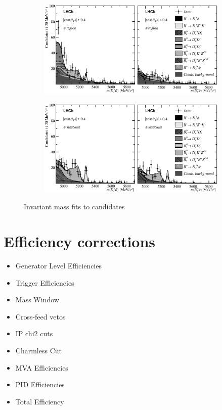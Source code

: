 \begin{figure}[!h]
    \centering
    \begin{subfigure}[t]{1.0\textwidth}
        \includegraphics[width=1.0\textwidth]{figs/B2DsPhi/Fig4a.eps}
    \end{subfigure}
    \begin{subfigure}[t]{1.0\textwidth}
        \includegraphics[width=1.0\textwidth]{figs/B2DsPhi/Fig4b.eps}
    \end{subfigure}
    \caption{Invariant mass fits to \decay{\Bp}{\Dsp\phiz} candidates}
\end{figure}



\section{Efficiency corrections}
\label{sec:B2DsPhi_effcorrections}


\begin{itemize}
\item Generator Level Efficiencies
\item Trigger Efficiencies
\item Mass Window
\item Cross-feed vetos
\item IP chi2 cuts
\item Charmless Cut
\item MVA Efficiencies
\item PID Efficiencies
\item Total Efficiency
\end{itemize}

